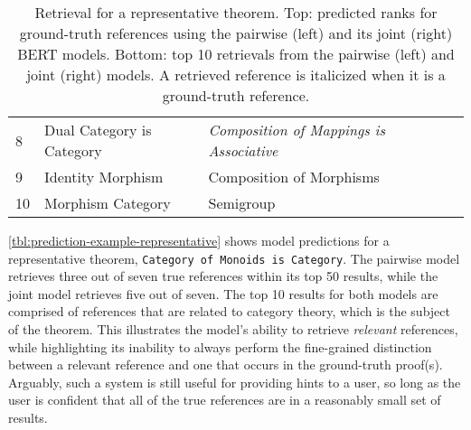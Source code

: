 \begin{table*}[t]
\begin{center}
{\begin{tabular}{llllll}
8&Dual Category is Category                         & \multicolumn{2}{l}{\textit{Composition of Mappings is Associative}}   \\
9&Identity Morphism                                 & \multicolumn{2}{l}{Composition of Morphisms}   \\
10&Morphism Category                                & \multicolumn{2}{l}{Semigroup} \\
\bottomrule
\end{tabular}}
\caption{
    Retrieval for a representative theorem. Top: predicted ranks for ground-truth references using the pairwise (left) and its joint (right) BERT models. Bottom: top 10 retrievals from the pairwise (left) and joint (right) models.
    A retrieved reference is italicized when it is a ground-truth reference.
}
\label{tbl:prediction-example-representative}
\end{center}
\end{table*}
\autoref{tbl:prediction-example-representative} shows model predictions for a representative theorem, \texttt{Category of Monoids is Category}.
The pairwise model retrieves three out of seven true references within its top 50 results, while the joint model retrieves five out of seven.
The top 10 results for both models are comprised of references that are related to category theory, which is the subject of the theorem.
This illustrates the model's ability to retrieve \textit{relevant} references, while highlighting its inability to always perform the fine-grained distinction between a relevant reference and one that occurs in the ground-truth proof(s).
Arguably, such a system is still useful for providing hints to a user, so long as the user is confident that all of the true references are in a reasonably small set of results.

